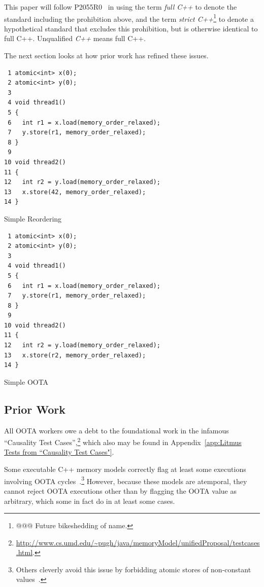 \documentclass[10]{article}
\begin{document}
This paper will follow P2055R0~\cite{PaulEMcKenney2020RelaxedGuideRelaxed}
in using the term \emph{full C++} to denote the standard including the
prohibition above, and the term \emph{strict C++}\footnote{
	@@@ Future bikeshedding of name.}
to denote a hypothetical standard that excludes this prohibition, but
is otherwise identical to full C++.
Unqualified \emph{C++} means full C++.

The next section looks at how prior work has refined these issues.

\begin{listing}[tbp]
\begin{verbatim}
 1 atomic<int> x(0);
 2 atomic<int> y(0);
 3
 4 void thread1()
 5 {
 6   int r1 = x.load(memory_order_relaxed);
 7   y.store(r1, memory_order_relaxed);
 8 }
 9
10 void thread2()
11 {
12   int r2 = y.load(memory_order_relaxed);
13   x.store(42, memory_order_relaxed);
14 }
\end{verbatim}
\caption{Simple Reordering}
\label{lst:Simple Reordering}
\end{listing}

\begin{listing}[tbp]
\begin{verbatim}
 1 atomic<int> x(0);
 2 atomic<int> y(0);
 3
 4 void thread1()
 5 {
 6   int r1 = x.load(memory_order_relaxed);
 7   y.store(r1, memory_order_relaxed);
 8 }
 9
10 void thread2()
11 {
12   int r2 = y.load(memory_order_relaxed);
13   x.store(r2, memory_order_relaxed);
14 }
\end{verbatim}
\caption{Simple OOTA}
\label{lst:Simple OOTA}
\end{listing}

\subsection{Prior Work}
\label{sec:Prior Work}

All OOTA workers owe a debt to the foundational work in the infamous
``Causality Test Cases'',\footnote{
	\url{http://www.cs.umd.edu/~pugh/java/memoryModel/unifiedProposal/testcases.html}.}
which also may be found in
Appendix~\ref{app:Litmus Tests from “Causality Test Cases"}.

Some executable C++ memory models correctly flag at least some executions
involving OOTA cycles~\cite{JadeAlglave2014HerdingCats}.\footnote{
	Others cleverly avoid this issue by forbidding atomic
	stores of non-constant values~\cite{MarkBatty2011cppmem}.}
However, because these models are atemporal, they cannot reject
OOTA executions other than by flagging the OOTA value as arbitrary,
which some in fact do in at least some cases.
\end{document}
